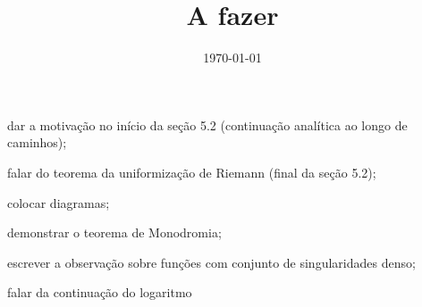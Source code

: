 \documentclass[12pt,a4paper]{article}
\title{A fazer}
\author{}
\date{\today}
\newcommand{\cmark}{\ding{51}}%
\newcommand{\done}{\rlap{$\square$}{\raisebox{2pt}{\large\hspace{1pt}\cmark}}%
\hspace{-2.5pt}}
\begin{document}
\maketitle

\begin{todolist}
    \item dar a motivação no início da seção 5.2 (continuação analítica ao longo
    de caminhos);
    \item falar do teorema da uniformização de Riemann (final da seção 5.2); 
    \item colocar diagramas;
    \item[\done] demonstrar o teorema de Monodromia;
    \item escrever a observação sobre funções com conjunto de singularidades denso;
    \item[\done] falar da continuação do logaritmo

\end{todolist}
\end{document}
